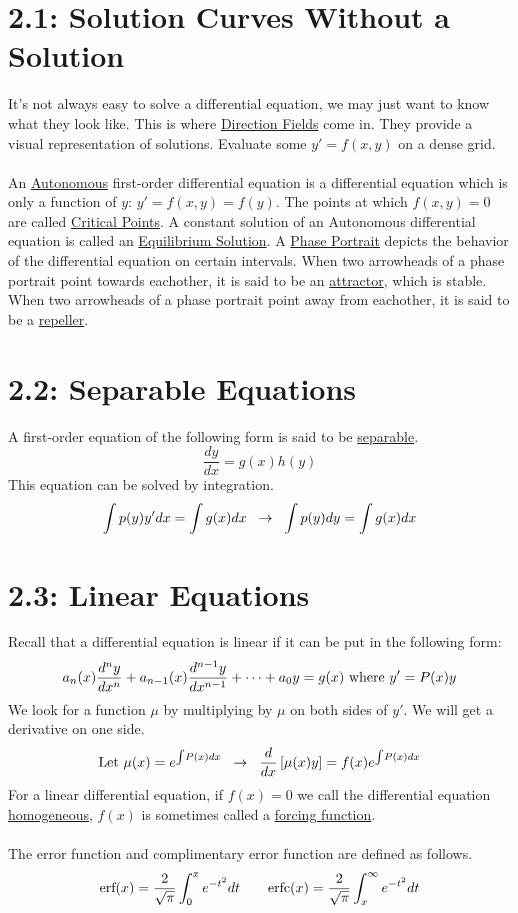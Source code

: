 \documentclass{article}
\begin{document}
\section*{2.1: Solution Curves Without a Solution}
It's not always easy to solve a differential equation, we may just want to know what they look like. This is where \underline{Direction Fields} come in. They provide a visual representation of solutions. Evaluate some \(y'=f(x,y)\) on a dense grid.\\\\
An \underline{Autonomous} first-order differential equation is a differential equation which is only a function of \(y\): \(y'=f(x,y)=f(y)\). The points at which \(f(x,y)=0\) are called \underline{Critical Points}. A constant solution of an Autonomous differential equation is called an \underline{Equilibrium Solution}. A \underline{Phase Portrait} depicts the behavior of the differential equation on certain intervals. When two arrowheads of a phase portrait point towards eachother, it is said to be an \underline{attractor}, which is stable. When two arrowheads of a phase portrait point away from eachother, it is said to be a \underline{repeller}.
\section*{2.2: Separable Equations}
A first-order equation of the following form is said to be \underline{separable}.
\[\frac{dy}{dx}=g(x)h(y)\]
This equation can be solved by integration.
\[\int p(y)y'dx=\int g(x)dx \hspace{2 mm}\rightarrow\hspace{2 mm}\int p(y)dy=\int g(x)dx\]
\section*{2.3: Linear Equations}
Recall that a differential equation is linear if it can be put in the following form:
\[a_n(x)\frac{d^ny}{dx^n}+a_{n-1}(x)\frac{d^{n-1}y}{dx^{n-1}}+\cdots+a_0y=g(x)\,\,\textnormal{where}\,\,y'=P(x)y\]
We look for a function \(\mu\) by multiplying by \(\mu\) on both sides of \(y'\). We will get a derivative on one side.
\[\textnormal{Let }\mu(x)=e^{\int\!P(x)dx}\hspace{2 mm}\rightarrow\hspace{2 mm}\frac{d}{dx}\left[\mu(x)y\right]=f(x)e^{\int\!P(x)dx}\]
For a linear differential equation, if \(f(x)=0\) we call the differential equation \underline{homogeneous}, \(f(x)\) is sometimes called a \underline{forcing function}.\\\\
The error function and complimentary error function are defined as follows.
\[\textnormal{erf}(x)=\frac{2}{\sqrt{\pi}}\int_0^xe^{-t^2}dt\hspace{7 mm}\textnormal{erfc}(x)=\frac{2}{\sqrt{\pi}}\int_x^\infty e^{-t^2}dt\]
\end{document}
